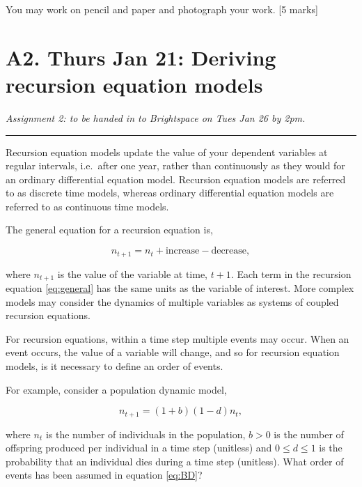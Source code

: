\documentclass[]{book}
\begin{document}
You may work on pencil and paper and photograph your work. {[}5 marks{]}

\chapter{A2. Thurs Jan 21: Deriving recursion equation
models}\label{a2.-thurs-jan-21-deriving-recursion-equation-models}

\emph{Assignment 2: to be handed in to Brightspace on Tues Jan 26 by
2pm.}

\begin{center}\rule{0.5\linewidth}{0.5pt}\end{center}

Recursion equation models update the value of your dependent variables
at regular intervals, i.e.~after one year, rather than continuously as
they would for an ordinary differential equation model. Recursion
equation models are referred to as discrete time models, whereas
ordinary differential equation models are referred to as continuous time
models.

The general equation for a recursion equation is,

\begin{equation}
n_{t+1} = n_t + \mbox{increase} - \mbox{decrease},
\label{eq:general}
\end{equation}

where \(n_{t+1}\) is the value of the variable at time, \(t+1\). Each
term in the recursion equation \eqref{eq:general} has the same units as
the variable of interest. More complex models may consider the dynamics
of multiple variables as systems of coupled recursion equations.

For recursion equations, within a time step multiple events may occur.
When an event occurs, the value of a variable will change, and so for
recursion equation models, is it necessary to define an order of events.

For example, consider a population dynamic model,

\begin{equation}
n_{t+1} = (1+b)(1-d)n_t,
\label{eq:BD}
\end{equation}

where \(n_t\) is the number of individuals in the population, \(b>0\) is
the number of offspring produced per individual in a time step
(unitless) and \(0 \leq d \leq 1\) is the probability that an individual
dies during a time step (unitless). What order of events has been
assumed in equation \eqref{eq:BD}?
\end{document}
